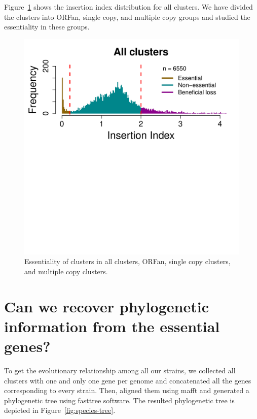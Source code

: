 \documentclass[a4paper,10pt, twocolumn]{article}
\begin{document}
Figure~\ref{fig:ii-clusters} shows the insertion index distribution for all clusters. We have divided the clusters into ORFan, single copy, and multiple copy groups and studied the essentiality in these groups.

\begin{figure}[H]
\includegraphics[scale=0.4]{cluster-essentiality.pdf}
\caption{Essentiality of clusters in all clusters, ORFan, single copy clusters, and multiple copy clusters.}
\label{fig:ii-clusters}
\end{figure}

\section{Can we recover phylogenetic information from the essential genes?}
To get the evolutionary relationship among all our strains, we collected all clusters with one and only one gene per genome and concatenated all the genes corresponding to every strain. Then, aligned them using mafft and generated a phylogenetic tree using fasttree software. The resulted phylogenetic tree is depicted in Figure~\ref{fig:species-tree}.
\end{document}
